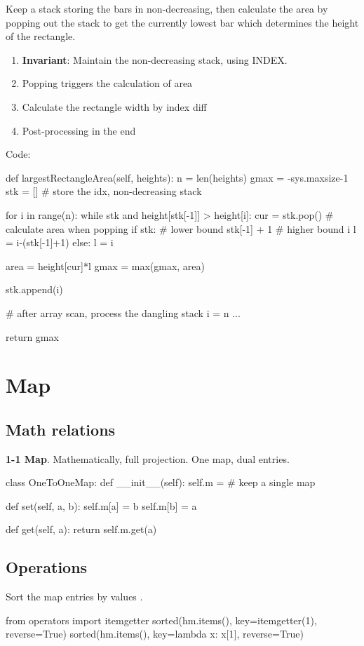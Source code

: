 Keep a stack storing the bars in non-decreasing, then calculate the area by popping out the stack to get the currently lowest bar which determines the height of the rectangle.
\\
\begin{enumerate}
\item \textbf{Invariant}: Maintain the non-decreasing stack, using INDEX.
\item Popping triggers the calculation of area
\item Calculate the rectangle width by index diff
\item Post-processing in the end
\end{enumerate}

Code:
\begin{python}
def largestRectangleArea(self, heights):
    n = len(heights)
    gmax = -sys.maxsize-1
    stk = []  # store the idx, non-decreasing stack

    for i in range(n):
        while stk and height[stk[-1]] > height[i]:
            cur = stk.pop()
            # calculate area when popping
            if stk:
                # lower bound stk[-1] + 1
                # higher bound i 
                l = i-(stk[-1]+1)
            else:
            	l = i
	
            area = height[cur]*l
            gmax = max(gmax, area)

        stk.append(i)

    # after array scan, process the dangling stack
    i = n
    ...

    return gmax
\end{python}

\section{Map}
\subsection{Math relations}
\textbf{1-1 Map}. Mathematically, full projection. One map, dual entries.
\begin{python}
class OneToOneMap:
    def __init__(self):
        self.m = {}  # keep a single map

    def set(self, a, b):
        self.m[a] = b
        self.m[b] = a

    def get(self, a):
        return self.m.get(a)
\end{python}
\subsection{Operations}
 Sort the map entries by values .
\begin{python}
from operators import itemgetter 
sorted(hm.items(), key=itemgetter(1), reverse=True)
sorted(hm.items(), key=lambda x: x[1], reverse=True)
\end{python}
